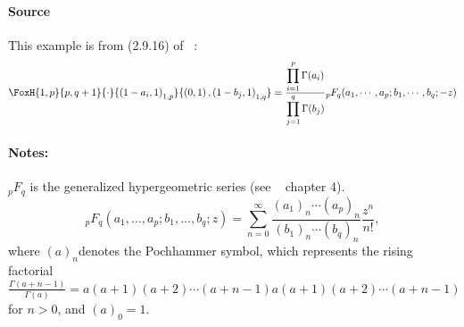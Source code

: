 \paragraph{Source} This example is from (2.9.16) of
~\cite{kilbas.saigo:04:h-transforms}:
\begin{align*}
  \FoxH
    {1,p}
    {p,q+1}
    {\cdot}
    {\left(1-a_i, 1\right)_{1,p}}
    {\left(0, 1\right), \left(1-b_j, 1\right)_{1,q}}=\frac{\displaystyle\prod_{i=1}^{p}\Gamma(a_i)}{\displaystyle\prod_{j=1}^{q}\Gamma(b_j)}{}_pF_q(a_1,\cdots, a_p;b_1,\cdots, b_q;-z)
\end{align*}
\paragraph{Notes:}
${}_pF_q$ is the generalized hypergeometric series (see ~\cite{erdelyi.magnus.ea:81:higher*1} chapter 4).
$${}_pF_q(a_1, \ldots, a_p; b_1, \ldots, b_q; z) = \sum_{n=0}^{\infty} \frac{(a_1)_n \cdots (a_p)_n}{(b_1)_n \cdots (b_q)_n} \frac{z^n}{n!},$$
where  $(a)_n$denotes the Pochhammer symbol, which represents the rising factorial $\frac{\Gamma{(a+n-1)}}{\Gamma{(a)}} = a(a+1)(a+2)⋯(a+n−1)a(a+1)(a+2)⋯(a+n−1)$ for $n > 0$, and $(a)_0=1$.
